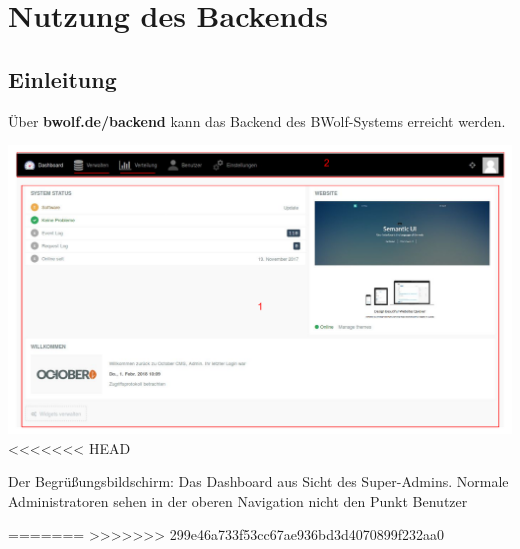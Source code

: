 \chapter{Nutzung des Backends}
\label{chapter:use}
  
  \section{Einleitung}
  \label{section:backend_introduction}
  
  Über \textbf{bwolf.de/backend} kann das Backend des BWolf-Systems erreicht werden.
  
  \includegraphics[scale=0.3]{backend/img/dashboard.pdf}
<<<<<<< HEAD
  \caption{\newline Der Begrüßungsbildschirm: Das Dashboard aus Sicht des Super-Admins.\newline
	  Normale Administratoren sehen in der oberen Navigation nicht den Punkt Benutzer}
=======
>>>>>>> 299e46a733f53cc67ae936bd3d4070899f232aa0
